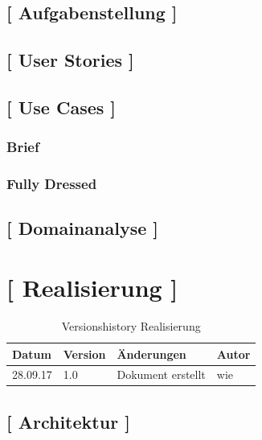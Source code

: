 \documentclass[11pt,a4paper,english,oneside]{book}
\numberwithin{equation}{chapter}
\begin{document}
	\section{[ Aufgabenstellung ]}
	
	\section{[ User Stories ]}
	
	\section{[ Use Cases ]}
	
	\subsection{Brief}
	
	\subsection{Fully Dressed}
	
	\section{[ Domainanalyse ]}
	
	
	
	
	\chapter{ [ Realisierung ]}
	
		\begin{table}[h!]
		\centering
		\begin{tabularx}{\linewidth}{X X X X}
			\toprule 
			Datum & Version & Änderungen & Autor \\
			\midrule
			28.09.17 & 1.0 & Dokument erstellt & wie \\
			\bottomrule 
		\end{tabularx} 
		\caption{Versionshistory Realisierung} 
		\end{table}
	
	\section{ [ Architektur ] }
	
\end{document}
